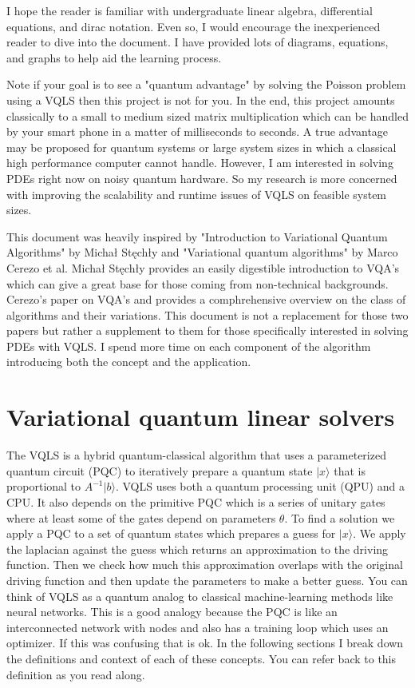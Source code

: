 \documentclass[12pt, oneside]{book}
\begin{document}
I hope the reader is familiar with undergraduate linear algebra, differential equations, 
and dirac notation. Even so, I would encourage the inexperienced reader to dive 
into the document. I have provided lots of diagrams, equations, and graphs to help aid the learning process. 

Note if your goal is to see a "quantum advantage" by solving the Poisson 
problem using a VQLS then this project is not for you. In the end, this project 
amounts classically to a small to medium sized matrix multiplication which 
can be handled by your smart phone in a matter of milliseconds to seconds. 
A true advantage may be proposed for quantum systems or large system sizes in which a classical 
high performance computer cannot handle. However, I am interested in solving PDEs 
right now on noisy quantum hardware. So my research is more concerned with 
improving the scalability and runtime issues of VQLS on feasible system sizes. 

This document was heavily inspired by "Introduction to Variational Quantum 
Algorithms" by Michał Stęchły and "Variational quantum algorithms" by Marco Cerezo et al. 
Michał Stęchły provides an easily digestible introduction to VQA's which 
can give a great base for those coming from non-technical backgrounds. Cerezo's paper 
on VQA's and provides a comphrehensive overview on the class of algorithms
and their variations. This document is not a replacement for those two papers but rather a supplement to them 
for those specifically interested in solving PDEs with VQLS. I spend more time on each 
component of the algorithm introducing both the concept and the application. 
\chapter{Variational quantum linear solvers}

The VQLS is a hybrid quantum-classical algorithm that uses a parameterized quantum circuit (PQC)
to iteratively prepare a quantum state $|x\rangle$ that is proportional to $A^{-1}|b\rangle$. 
VQLS uses both a quantum processing unit (QPU) and a CPU. It also depends on the 
primitive PQC which is a series of unitary gates where at least some of the gates depend on 
parameters $\theta$. To find a solution we apply a PQC to a set of quantum states which prepares a guess for $|x\rangle$.
We apply the laplacian against the guess which returns an approximation to the driving function. Then we check how much this approximation
overlaps with the original driving function and then update the parameters to make a better guess. You can 
think of VQLS as a quantum analog to classical machine-learning methods like neural networks. This is a good analogy because the 
PQC is like an interconnected network with nodes and also has a training loop which uses an optimizer. If this was confusing 
that is ok. In the following sections I break down the definitions and context of each of these concepts. You can 
refer back to this definition as you read along. 
\end{document}
